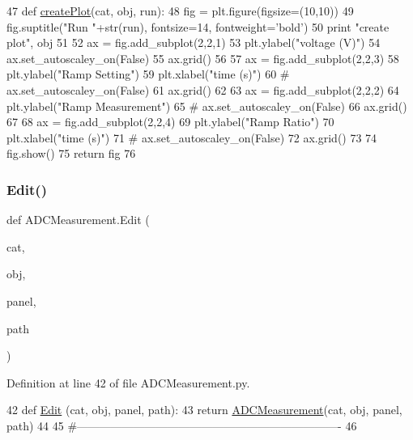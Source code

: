 \begin{DoxyCode}
47 \textcolor{keyword}{def }\hyperlink{namespaceADCMeasurement_ac7c6b7cd094e2747ee244094afbbb7d0}{createPlot}(cat, obj, run):
48     fig = plt.figure(figsize=(10,10))
49     fig.suptitle(\textcolor{stringliteral}{"Run "}+str(run), fontsize=14, fontweight=\textcolor{stringliteral}{'bold'})
50     \textcolor{keywordflow}{print} \textcolor{stringliteral}{"create plot"}, obj
51 
52     ax = fig.add\_subplot(2,2,1)
53     plt.ylabel(\textcolor{stringliteral}{"voltage (V)"})
54     ax.set\_autoscaley\_on(\textcolor{keyword}{False})
55     ax.grid()
56 
57     ax = fig.add\_subplot(2,2,3)
58     plt.ylabel(\textcolor{stringliteral}{"Ramp Setting"})
59     plt.xlabel(\textcolor{stringliteral}{"time (s)"})
60 \textcolor{comment}{#    ax.set\_autoscaley\_on(False)}
61     ax.grid()
62 
63     ax = fig.add\_subplot(2,2,2)
64     plt.ylabel(\textcolor{stringliteral}{"Ramp Measurement"})
65 \textcolor{comment}{#    ax.set\_autoscaley\_on(False)}
66     ax.grid()        
67 
68     ax = fig.add\_subplot(2,2,4)
69     plt.ylabel(\textcolor{stringliteral}{"Ramp Ratio"})
70     plt.xlabel(\textcolor{stringliteral}{"time (s)"})
71  \textcolor{comment}{#   ax.set\_autoscaley\_on(False)}
72     ax.grid()        
73 
74     fig.show()    
75     \textcolor{keywordflow}{return} fig
76 
\end{DoxyCode}
\mbox{\label{namespaceADCMeasurement_a6da448e6e3b79716e5b7fef078c662d8}} 
\subsubsection{\texorpdfstring{Edit()}{Edit()}}
{\footnotesize\ttfamily def A\+D\+C\+Measurement.\+Edit (\begin{DoxyParamCaption}\item[{}]{cat,  }\item[{}]{obj,  }\item[{}]{panel,  }\item[{}]{path }\end{DoxyParamCaption})}



Definition at line 42 of file A\+D\+C\+Measurement.\+py.


\begin{DoxyCode}
42 \textcolor{keyword}{def }\hyperlink{namespaceADCMeasurement_a6da448e6e3b79716e5b7fef078c662d8}{Edit} (cat, obj, panel, path):
43     \textcolor{keywordflow}{return} \hyperlink{classADCMeasurement}{ADCMeasurement}(cat, obj, panel, path)
44 
45 \textcolor{comment}{#----------------------------------------------------------------------}
46 
\end{DoxyCode}
\mbox{\label{namespaceADCMeasurement_a7de3411faf8be50e833090d1c10cc44f}} 
